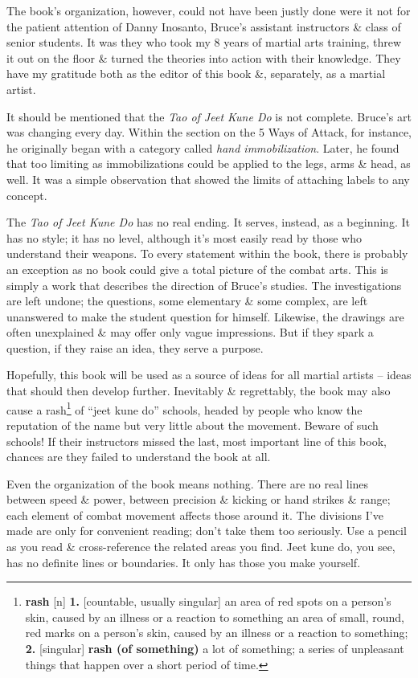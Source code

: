 \documentclass[oneside]{book}
\numberwithin{equation}{section}
\begin{document}
The book's organization, however, could not have been justly done were it not for the patient attention of Danny Inosanto, Bruce's assistant instructors \& class of senior students. It was they who took my 8 years of martial arts training, threw it out on the floor \& turned the theories into action with their knowledge. They have my gratitude both as the editor of this book \&, separately, as a martial artist.

It should be mentioned that the \textit{Tao of Jeet Kune Do} is not complete. Bruce's art was changing every day. Within the section on the 5 Ways of Attack, for instance, he originally began with a category called \textit{hand immobilization}. Later, he found that too limiting as immobilizations could be applied to the legs, arms \& head, as well. It was a simple observation that showed the limits of attaching labels to any concept.

The \textit{Tao of Jeet Kune Do} has no real ending. It serves, instead, as a beginning. It has no style; it has no level, although it's most easily read by those who understand their weapons. To every statement within the book, there is probably an exception as no book could give a total picture of the combat arts. This is simply a work that describes the direction of Bruce's studies. The investigations are left undone; the questions, some elementary \& some complex, are left unanswered to make the student question for himself. Likewise, the drawings are often unexplained \& may offer only vague impressions. But if they spark a question, if they raise an idea, they serve a purpose.

Hopefully, this book will be used as a source of ideas for all martial artists -- ideas that should then develop further. Inevitably \& regrettably, the book may also cause a rash\footnote{\textbf{rash} [n] \textbf{1.} [countable, usually singular] an area of red spots on a person's skin, caused by an illness or a reaction to something an area of small, round, red marks on a person's skin, caused by an illness or a reaction to something; \textbf{2.} [singular] \textbf{rash (of something)} a lot of something; a series of unpleasant things that happen over a short period of time.} of ``jeet kune do'' schools, headed by people who know the reputation of the name but very little about the movement. Beware of such schools! If their instructors missed the last, most important line of this book, chances are they failed to understand the book at all.

Even the organization of the book means nothing. There are no real lines between speed \& power, between precision \& kicking or hand strikes \& range; each element of combat movement affects those around it. The divisions I've made are only for convenient reading; don't take them too seriously. Use a pencil as you read \& cross-reference the related areas you find. Jeet kune do, you see, has no definite lines or boundaries. It only has those you make yourself.
\end{document}
